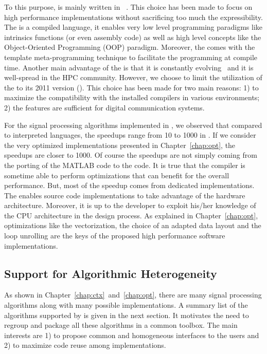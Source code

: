 To this purpose, \AFFECT is mainly written in \Cxx~\cite{Stroustrup2013}. This
choice has been made to focus on high performance implementations without
sacrificing too much the expressibility. The \Cxx is a compiled language, it
enables very low level programming paradigms like intrinsics functions (or even
assembly code) as well as high level concepts like the Object-Oriented
Programming (OOP) paradigm. Moreover, the \Cxx comes with the template
meta-programming technique to facilitate the programming at compile time.
Another main advantage of the \Cxx is that it is constantly
evolving~\cite{Stroustrup2020} and it is well-spread in the HPC community.
However, we choose to limit the utilization of the \Cxx to its 2011 version
(). This choice has been made for two main reasons: 1) to maximize the
compatibility with the installed compilers in various environments; 2) the
 features are sufficient for digital communication systems.

For the signal processing algorithms implemented in \AFFECT, we observed that
compared to interpreted languages, the speedups range from 10 to 1000 in \Cxx.
If we consider the very optimized implementations presented in
Chapter~\ref{chap:opt}, the speedups are closer to 1000. Of course the speedups
are not simply coming from the porting of the MATLAB code to the \Cxx code. It
is true that the compiler is sometime able to perform optimizations that can
benefit for the overall performance. But, most of the speedup comes from
dedicated implementations. The \Cxx enables source code implementations to take
advantage of the hardware architecture. Moreover, it is up to the developer to
exploit his/her knowledge of the CPU architecture in the design process. As
explained in Chapter~\ref{chap:opt}, optimizations like the vectorization, the
choice of an adapted data layout and the loop unrolling are the keys of the
proposed high performance software implementations.

\subsection{Support for Algorithmic Heterogeneity}

As shown in Chapter~\ref{chap:ctx}~and~\ref{chap:opt}, there are many signal
processing algorithms along with many possible implementations. A summary list
of the algorithms supported by \AFFECT is given in the next section. It
motivates the need to regroup and package all these algorithms in a common
toolbox. The main interests are 1) to propose common and homogeneous interfaces
to the users and 2) to maximize code reuse among implementations.


